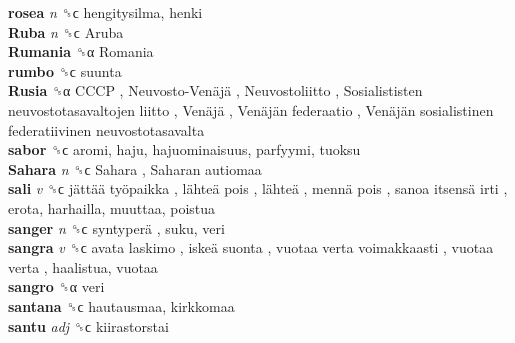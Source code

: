 \textbf{rosea} \emph{n}  ␝ϲ  hengitysilma, henki  \\
\textbf{Ruba} \emph{n}  ␝ϲ   Aruba   \\
\textbf{Rumania} ␝α   Romania   \\
\textbf{rumbo} ␝ϲ  suunta  \\
\textbf{Rusia} ␝α   CCCP ,  Neuvosto-Venäjä ,  Neuvostoliitto ,  Sosialististen neuvostotasavaltojen liitto ,  Venäjä ,  Venäjän federaatio ,  Venäjän sosialistinen federatiivinen neuvostotasavalta   \\
\textbf{sabor} ␝ϲ  aromi, haju, hajuominaisuus, parfyymi, tuoksu  \\
\textbf{Sahara} \emph{n}  ␝ϲ   Sahara ,  Saharan autiomaa   \\
\textbf{sali} \emph{v}  ␝ϲ   jättää työpaikka ,  lähteä pois ,  lähteä ,  mennä pois ,  sanoa itsensä irti , erota, harhailla, muuttaa, poistua  \\
\textbf{sanger} \emph{n}  ␝ϲ   syntyperä , suku, veri  \\
\textbf{sangra} \emph{v}  ␝ϲ   avata laskimo ,  iskeä suonta ,  vuotaa verta voimakkaasti ,  vuotaa verta , haalistua, vuotaa  \\
\textbf{sangro} ␝α  veri  \\
\textbf{santana} ␝ϲ  hautausmaa, kirkkomaa  \\
\textbf{santu} \emph{adj}  ␝ϲ  kiirastorstai  \\

